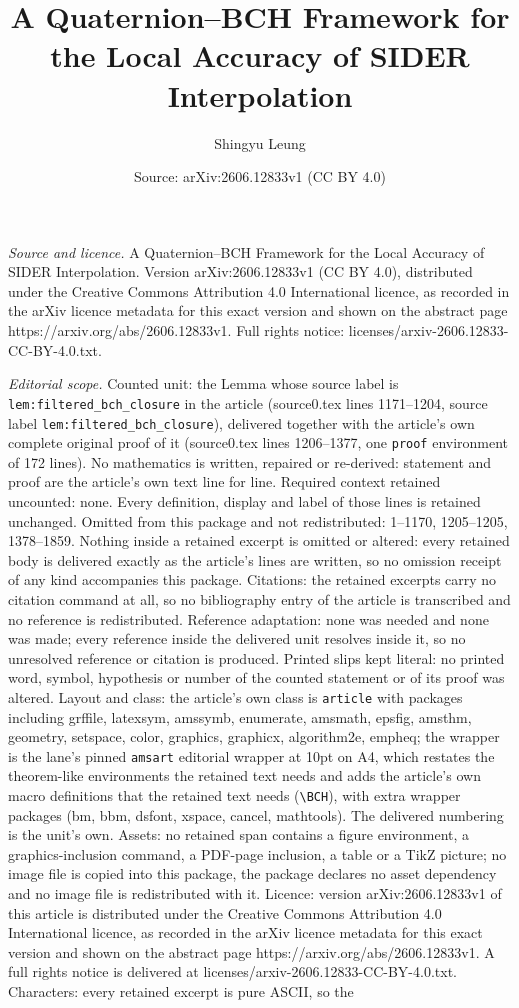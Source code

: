 \documentclass[10pt,a4paper]{amsart}
\title[A Quaternion--BCH Framework for the Local Accuracy of SIDER ]{A Quaternion--BCH Framework for the Local Accuracy of SIDER Interpolation}
\author{Shingyu Leung}
\date{Source: arXiv:2606.12833v1 (CC BY 4.0)}
\begin{document}
\maketitle

\noindent\emph{Source and licence.} A Quaternion--BCH Framework for the Local Accuracy of SIDER Interpolation. Version arXiv:2606.12833v1 (CC BY 4.0), distributed under the Creative Commons Attribution 4.0 International licence, as recorded in the arXiv licence metadata for this exact version and shown on the abstract page https://arxiv.org/abs/2606.12833v1. Full rights notice: licenses/arxiv-2606.12833-CC-BY-4.0.txt.\par\smallskip

\noindent\textit{Editorial scope.} Counted unit: the Lemma whose source label is \texttt{lem:filtered\_bch\_closure} in the article (source0.tex lines 1171--1204, source label \texttt{lem:filtered\_bch\_closure}), delivered together with the article's own complete original proof of it (source0.tex lines 1206--1377, one \texttt{proof} environment of 172 lines). No mathematics is written, repaired or re-derived: statement and proof are the article's own text line for line. Required context retained uncounted: none. Every definition, display and label of those lines is retained unchanged. Omitted from this package and not redistributed: 1--1170, 1205--1205, 1378--1859. Nothing inside a retained excerpt is omitted or altered: every retained body is delivered exactly as the article's lines are written, so no omission receipt of any kind accompanies this package. Citations: the retained excerpts carry no citation command at all, so no bibliography entry of the article is transcribed and no reference is redistributed. Reference adaptation: none was needed and none was made; every reference inside the delivered unit resolves inside it, so no unresolved reference or citation is produced. Printed slips kept literal: no printed word, symbol, hypothesis or number of the counted statement or of its proof was altered. Layout and class: the article's own class is \texttt{article} with packages including grffile, latexsym, amssymb, enumerate, amsmath, epsfig, amsthm, geometry, setspace, color, graphics, graphicx, algorithm2e, empheq; the wrapper is the lane's pinned \texttt{amsart} editorial wrapper at 10pt on A4, which restates the theorem-like environments the retained text needs and adds the article's own macro definitions that the retained text needs (\texttt{\textbackslash BCH}), with extra wrapper packages (bm, bbm, dsfont, xspace, cancel, mathtools). The delivered numbering is the unit's own. Assets: no retained span contains a figure environment, a graphics-inclusion command, a PDF-page inclusion, a table or a TikZ picture; no image file is copied into this package, the package declares no asset dependency and no image file is redistributed with it. Licence: version arXiv:2606.12833v1 of this article is distributed under the Creative Commons Attribution 4.0 International licence, as recorded in the arXiv licence metadata for this exact version and shown on the abstract page https://arxiv.org/abs/2606.12833v1. A full rights notice is delivered at licenses/arxiv-2606.12833-CC-BY-4.0.txt. Characters: every retained excerpt is pure ASCII, so the 
\end{document}
